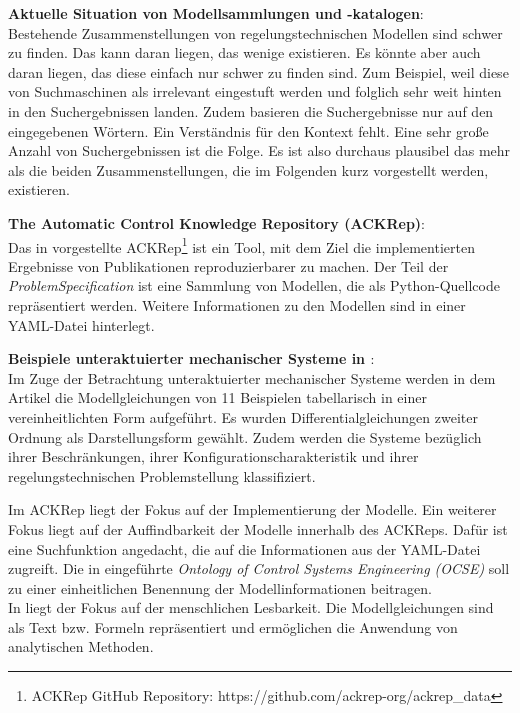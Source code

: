 \textbf{Aktuelle Situation von Modellsammlungen und -katalogen}: \\
Bestehende Zusammenstellungen von regelungstechnischen Modellen sind schwer zu finden. Das kann daran liegen, das wenige existieren. Es könnte aber auch daran liegen, das diese einfach nur schwer zu finden sind. Zum Beispiel, weil diese von Suchmaschinen als irrelevant eingestuft werden und folglich sehr weit hinten in den Suchergebnissen landen. Zudem basieren die Suchergebnisse nur auf den eingegebenen Wörtern. Ein Verständnis für den Kontext fehlt. Eine sehr große Anzahl von Suchergebnissen ist die Folge. Es ist also durchaus plausibel das mehr als die beiden Zusammenstellungen, die im Folgenden kurz vorgestellt werden, existieren. 

\textbf{The Automatic Control Knowledge Repository (ACKRep)}:\\
Das in \cite{KNHE20a} vorgestellte ACKRep\footnote{ACKRep GitHub Repository: https://github.com/ackrep-org/ackrep\_data} ist ein Tool, mit dem Ziel die implementierten Ergebnisse von Publikationen reproduzierbarer zu machen. Der Teil der \textit{ProblemSpecification} ist eine Sammlung von Modellen, die als Python-Quellcode repräsentiert werden. Weitere Informationen zu den Modellen sind in einer YAML-Datei hinterlegt. 

\textbf{Beispiele unteraktuierter mechanischer Systeme in \cite{LIYU13}}:\\
Im Zuge der Betrachtung unteraktuierter mechanischer Systeme werden in dem Artikel die Modellgleichungen von 11 Beispielen tabellarisch in einer vereinheitlichten Form aufgeführt. Es wurden Differentialgleichungen zweiter Ordnung als Darstellungsform gewählt. Zudem werden die Systeme bezüglich ihrer Beschränkungen, ihrer Konfigurationscharakteristik und ihrer regelungstechnischen Problemstellung klassifiziert.

Im ACKRep liegt der Fokus auf der Implementierung der Modelle. Ein weiterer Fokus liegt auf der Auffindbarkeit der Modelle innerhalb des ACKReps. Dafür ist eine Suchfunktion angedacht, die auf die Informationen aus der YAML-Datei zugreift. Die in \cite{KNHE20b} eingeführte \textit{Ontology of Control Systems Engineering (OCSE)} soll zu einer einheitlichen Benennung der Modellinformationen beitragen.\\
In \cite{LIYU13} liegt der Fokus auf der menschlichen Lesbarkeit. Die Modellgleichungen sind als Text bzw. Formeln repräsentiert und ermöglichen die Anwendung von analytischen Methoden. 

